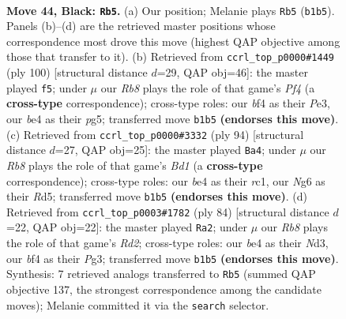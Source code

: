 \documentclass[11pt]{article}
\begin{document}
\clearpage

\begin{figure}[p]\centering
\begin{subfigure}{0.46\textwidth}\centering
\resizebox{\linewidth}{!}{%
\newchessgame
\chessboard[
  setfen={8/p6k/Pp4n1/8/4BB2/6K1/8/1r6 b - - 0 44},
  showmover=false,
  pgfstyle=straightmove, color=movearrow, markmove={b1-b5}
]}
\caption{}
\end{subfigure}\hfill
\begin{subfigure}{0.46\textwidth}\centering
\resizebox{\linewidth}{!}{%
\newchessgame
\chessboard[
  setfen={8/5k2/5b2/6p1/3N1P2/2K1P3/8/8 w - - 0 51},
  showmover=false,
  pgfstyle=straightmove, color=movearrow, markmove={f4-f5}
]}
\caption{}
\end{subfigure}
\\[4pt]
\begin{subfigure}{0.46\textwidth}\centering
\resizebox{\linewidth}{!}{%
\newchessgame
\chessboard[
  setfen={8/4k3/3b4/3R1p2/8/6P1/5PK1/2rB4 w - - 0 48},
  showmover=false,
  pgfstyle=straightmove, color=movearrow, markmove={d1-a4}
]}
\caption{}
\end{subfigure}\hfill
\begin{subfigure}{0.46\textwidth}\centering
\resizebox{\linewidth}{!}{%
\newchessgame
\chessboard[
  setfen={2r5/8/5k2/4bp2/8/3NPKP1/3R4/8 w - - 6 43},
  showmover=false,
  pgfstyle=straightmove, color=movearrow, markmove={d2-a2}
]}
\caption{}
\end{subfigure}
\caption{\textbf{Move 44, Black: \texttt{Rb5}.} (a) Our position; Melanie plays \texttt{Rb5} (\texttt{b1b5}). Panels (b)--(d) are the retrieved master positions whose correspondence most drove this move (highest QAP objective among those that transfer to it). (b) Retrieved from \texttt{ccrl\_top\_p0000\#1449} (ply 100) [structural distance $d$=29, QAP obj=46]: the master played \texttt{f5}; under $\mu$ our \emph{Rb8} plays the role of that game's \emph{Pf4} (a \textbf{cross-type} correspondence); cross-type roles: our \emph{b}f4 as their \emph{P}e3, our \emph{b}e4 as their \emph{p}g5; transferred move \texttt{b1b5} \textbf{(endorses this move)}. (c) Retrieved from \texttt{ccrl\_top\_p0000\#3332} (ply 94) [structural distance $d$=27, QAP obj=25]: the master played \texttt{Ba4}; under $\mu$ our \emph{Rb8} plays the role of that game's \emph{Bd1} (a \textbf{cross-type} correspondence); cross-type roles: our \emph{b}e4 as their \emph{r}c1, our \emph{N}g6 as their \emph{R}d5; transferred move \texttt{b1b5} \textbf{(endorses this move)}. (d) Retrieved from \texttt{ccrl\_top\_p0003\#1782} (ply 84) [structural distance $d$=22, QAP obj=22]: the master played \texttt{Ra2}; under $\mu$ our \emph{Rb8} plays the role of that game's \emph{Rd2}; cross-type roles: our \emph{b}e4 as their \emph{N}d3, our \emph{b}f4 as their \emph{P}g3; transferred move \texttt{b1b5} \textbf{(endorses this move)}. Synthesis: 7 retrieved analogs transferred to \texttt{Rb5} (summed QAP objective 137, the strongest correspondence among the candidate moves); Melanie committed it via the \texttt{search} selector.}
\label{fig:thought-m87}
\end{figure}
\end{document}
